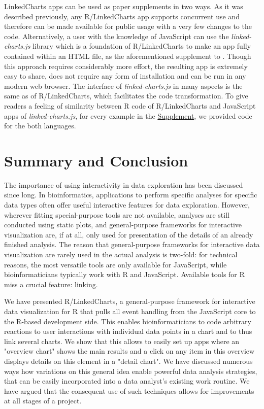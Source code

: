 \documentclass[twocolumn,10pt]{article}
\newcommand{\Supplement}{\href{https://anders-biostat.github.io/lc-paper/}{Supplement}}
\begin{document}
LinkedCharts apps can be used as paper supplements in two ways. As it was described previously, any R/LinkedCharts app supports concurrent use and therefore can be made available for public usage with a very few changes to the code. Alternatively, a user with the knowledge of JavaScript can use the \emph{linked-charts.js} library which is a foundation of R/LinkedCharts to make an app fully contained within an HTML file, as the aforementioned supplement to \citet{wang_2020}. Though this approach requires considerably more effort, the resulting app is extremely easy to share, does not require any form of installation and can be run in any modern web browser. The interface of \emph{linked-charts.js} in many aspects is the same as of R/LinkedCharts, which facilitates the code transformation. To give readers a feeling of similarity between R code of R/LinkedCharts and JavaScript apps of \emph{linked-charts.js}, for every example in the \Supplement, we provided code for the both languages.

\section{Summary and Conclusion}

The importance of using interactivity in data exploration has been discussed since long. In bioinformatics, applications to perform specific analyses for specific data types often offer useful interactive features for data exploration. However, wherever fitting special-purpose tools are not available, analyses are still conducted using static plots, and general-purpose frameworks for interactive visualization are, if at all, only used for presentation of the details of an already finished analysis. The reason that general-purpose frameworks for interactive data visualization are rarely used in the actual analysis is two-fold: for technical reasons, the most versatile tools are only available for JavaScript, while bioinformaticians typically work with R and JavaScript. Available tools for R miss a crucial feature: linking.

We have presented R/LinkedCharts, a general-purpose framework for interactive data visualization for R that pulls all event handling from the JavaScript core to the R-based development side. This enables bioinformaticians to code arbitrary reactions to user interactions with individual data points in a chart and to thus link several charts. We show that this allows to easily set up apps where an "overview chart" shows the main results and a click on any item in this overview displays details on this element in a "detail chart". We have discussed numerous ways how variations on this general idea enable powerful data analysis strategies, that can be easily incorporated into a data analyst's existing work routine. We have argued that the consequent use of such techniques allows for improvements at all stages of a project.
\end{document}
